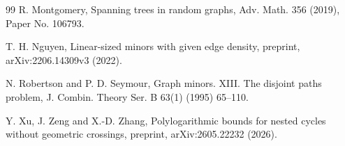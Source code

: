 \documentclass[10pt,letterpaper]{article}
\theoremstyle{definition}
\theoremstyle{remark}
\begin{document}
\begin{thebibliography}{99}
R. Montgomery, Spanning trees in random graphs, Adv. Math. 356 (2019), Paper No. 106793.

T. H. Nguyen, Linear-sized minors with given edge density, preprint, arXiv:2206.14309v3 (2022).

N. Robertson and P. D. Seymour, Graph minors. XIII. The disjoint paths problem, J. Combin. Theory Ser. B 63(1) (1995) 65--110.

Y. Xu, J. Zeng and X.-D. Zhang, Polylogarithmic bounds for nested cycles without geometric crossings, preprint, arXiv:2605.22232 (2026).

\end{thebibliography}
\end{document}
